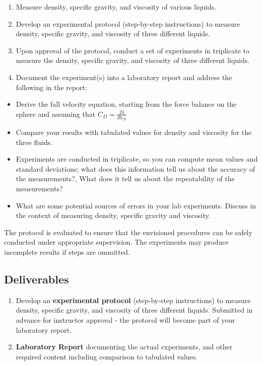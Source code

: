 \documentclass[11pt]{article}
\providecommand{\tightlist}{%
      \setlength{\itemsep}{0pt}\setlength{\parskip}{0pt}}
\begin{document}
\begin{enumerate}
\def\labelenumi{\arabic{enumi}.}
\tightlist
\item
  Measure density, specific gravity, and viscosity of various liquids.
\item
  Develop an experimental protocol (step-by-step instructions) to
  measure density, specific gravity, and viscosity of three different
  liquids.
\item
  Upon approval of the protocol, conduct a set of experiments in
  triplicate to measure the density, specific gravity, and viscosity of
  three different liquids.
\item
  Document the experiment(s) into a laboratory report and address the
  following in the report:
\end{enumerate}

\begin{itemize}
\tightlist
\item
  Derive the fall velocity equation, starting from the force balance on
  the sphere and assuming that \(C_D=\frac{24}{Re_D}\)
\item
  Compare your results with tabulated values for density and viscosity
  for the three fluids.
\item
  Experiments are conducted in triplicate, so you can compute mean
  values and standard deviations; what does this information tell us
  about the accuracy of the measurements?, What does it tell us about
  the repeatability of the measurements?
\item
  What are some potential sources of errors in your lab experiments.
  Discuss in the context of measuring density, specific gravity and
  viscosity.
\end{itemize}

The protocol is evaluated to ensure that the envisioned procedures can
be safely conducted under appropriate supervision. The experiments may
produce incomplete results if steps are ommitted.

    \hypertarget{deliverables}{%
\subsection{Deliverables}\label{deliverables}}

\begin{enumerate}
\def\labelenumi{\arabic{enumi}.}
\tightlist
\item
  Develop an \textbf{experimental protocol} (step-by-step instructions)
  to measure density, specific gravity, and viscosity of three different
  liquids. Submitted in advance for instructor approval - the protocol
  will become part of your laboratory report.
\item
  \textbf{Laboratory Report} documenting the actual experiments, and
  other required content including comparison to tabulated values.
\end{enumerate}
\end{document}

